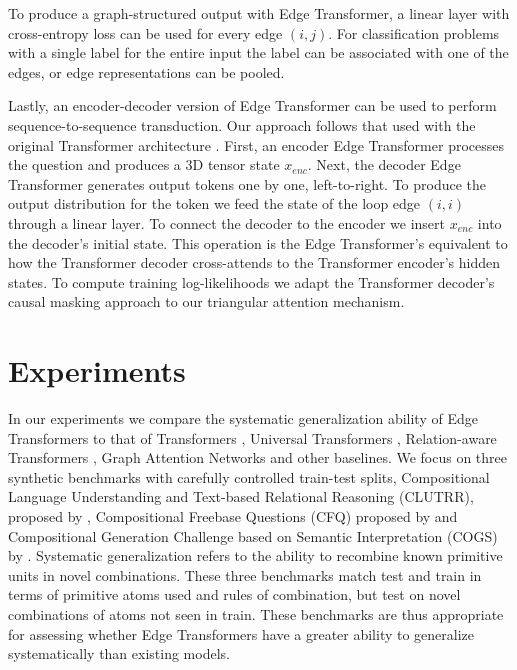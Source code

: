 \documentclass{article}
\begin{document}
To produce a graph-structured output with Edge Transformer, a linear
layer with cross-entropy loss can be used for every edge $(i, j)$. For
classification problems with a single label for the entire input the label can be
associated with one of the edges, or edge representations can be
pooled. 

Lastly, an encoder-decoder version of Edge Transformer can be used to perform sequence-to-sequence transduction. Our approach follows that used
with the original Transformer architecture
\citep{vaswani_attention_2017}. First, an encoder Edge Transformer
processes the question and produces a 3D tensor state $x_{enc}$. Next,
the decoder Edge Transformer generates output tokens one by one,
left-to-right. To produce the output distribution for the token we
feed the state of the loop edge $(i,i)$ through a linear layer. To
connect the decoder to the encoder we insert $x_{enc}$ into the
decoder’s initial state. This operation is the Edge Transformer’s
equivalent to how the Transformer decoder cross-attends to the
Transformer encoder’s hidden states. To compute training
log-likelihoods we adapt the Transformer decoder’s causal masking
approach to our triangular attention mechanism.

\section{Experiments}
\label{sec:experiments}

 

In our experiments we compare the systematic generalization
ability of Edge Transformers to that of Transformers
\citep{vaswani_attention_2017}, Universal Transformers \citep{dehghani_universal_2019}, Relation-aware Transformers
\citep{shaw_self-attention_2018}, Graph Attention Networks
\citep{velickovic_graph_2018} and other baselines. We focus on three synthetic benchmarks
with carefully controlled train-test splits, Compositional Language
Understanding and Text-based Relational Reasoning (CLUTRR), proposed
by \citet{sinha_clutrr_2019}, Compositional Freebase Questions
(CFQ) proposed by \citet{keysers_measuring_2020} and Compositional Generation Challenge based on Semantic Interpretation (COGS) by \citet{kim_cogs_2020}. Systematic
generalization refers to the ability to recombine known primitive
units in novel combinations. These three benchmarks match test and train in
terms of primitive atoms used and rules of combination, but test on
novel combinations of atoms not seen in train. These benchmarks are
thus appropriate for assessing whether Edge Transformers have a
greater ability to generalize systematically than existing models.
\end{document}
